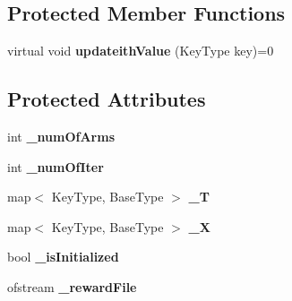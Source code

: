 \subsection*{Protected Member Functions}
\begin{DoxyCompactItemize}
\item 
\hypertarget{classMultiBoost_1_1GenericBanditAlgorithmLS_ae8ed261f8406a8b7143b6a4cda20f5cf}{virtual void {\bfseries updateith\-Value} (Key\-Type key)=0}\label{classMultiBoost_1_1GenericBanditAlgorithmLS_ae8ed261f8406a8b7143b6a4cda20f5cf}

\end{DoxyCompactItemize}
\subsection*{Protected Attributes}
\begin{DoxyCompactItemize}
\item 
\hypertarget{classMultiBoost_1_1GenericBanditAlgorithmLS_aabdd78debc51cbb5f31dbbc3966709e7}{int {\bfseries \-\_\-num\-Of\-Arms}}\label{classMultiBoost_1_1GenericBanditAlgorithmLS_aabdd78debc51cbb5f31dbbc3966709e7}

\item 
\hypertarget{classMultiBoost_1_1GenericBanditAlgorithmLS_a91aeb8d35c5cb78998fc94dae72631e4}{int {\bfseries \-\_\-num\-Of\-Iter}}\label{classMultiBoost_1_1GenericBanditAlgorithmLS_a91aeb8d35c5cb78998fc94dae72631e4}

\item 
\hypertarget{classMultiBoost_1_1GenericBanditAlgorithmLS_a7b159c23d990c4572ab31da193226292}{map$<$ Key\-Type, Base\-Type $>$ {\bfseries \-\_\-\-T}}\label{classMultiBoost_1_1GenericBanditAlgorithmLS_a7b159c23d990c4572ab31da193226292}

\item 
\hypertarget{classMultiBoost_1_1GenericBanditAlgorithmLS_aed82057dee87038297e20e81e204c316}{map$<$ Key\-Type, Base\-Type $>$ {\bfseries \-\_\-\-X}}\label{classMultiBoost_1_1GenericBanditAlgorithmLS_aed82057dee87038297e20e81e204c316}

\item 
\hypertarget{classMultiBoost_1_1GenericBanditAlgorithmLS_a5547b470ad2193ece9e6f8ba962d2c1c}{bool {\bfseries \-\_\-is\-Initialized}}\label{classMultiBoost_1_1GenericBanditAlgorithmLS_a5547b470ad2193ece9e6f8ba962d2c1c}

\item 
\hypertarget{classMultiBoost_1_1GenericBanditAlgorithmLS_a765a14b51253c031ed313b7f3117c880}{ofstream {\bfseries \-\_\-reward\-File}}\label{classMultiBoost_1_1GenericBanditAlgorithmLS_a765a14b51253c031ed313b7f3117c880}

\end{DoxyCompactItemize}


